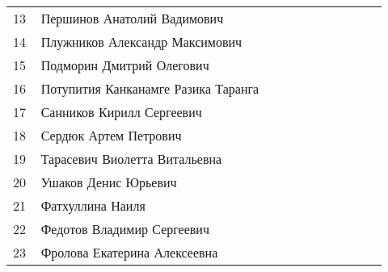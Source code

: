 \documentclass[a4paper,landscape,11pt]{article}
\newcommand*\ok{&{\small \ding{51}}} %
\newcommand*\no{&{\small }} %
\begin{document}
\begin{tabular}{p{7pt}|l|p{\CS}|p{\CS}|p{\CS}|p{\CS}|p{\CS}|p{\CS}|p{\CS}|p{\CS}|p{\CS}}
13\,& Першинов Анатолий Вадимович         \no&&&&&&&\\
14\,& Плужников Александр Максимович      \no&&&&&&&\\
15\,& Подморин Дмитрий Олегович           \ok&&&&&&&\\
\midrule
16\,& Потупития Канканамге Разика Таранга \ok&&&&&&&\\
17\,& Санников Кирилл Сергеевич           \ok&&&&&&&\\
18\,& Сердюк Артем Петрович               \ok&&&&&&&\\ 
19\,& Тарасевич Виолетта Витальевна       \ok&&&&&&&\\
20\,& Ушаков Денис Юрьевич                \ok&&&&&&&\\
\midrule
21\,& Фатхуллина Наиля                    \ok&&&&&&&\\
22\,& Федотов Владимир Сергеевич          \ok&&&&&&&\\
23\,& Фролова Екатерина Алексеевна        \ok&&&&&&&\\
\bottomrule
\end{tabular} 
\end{document}

